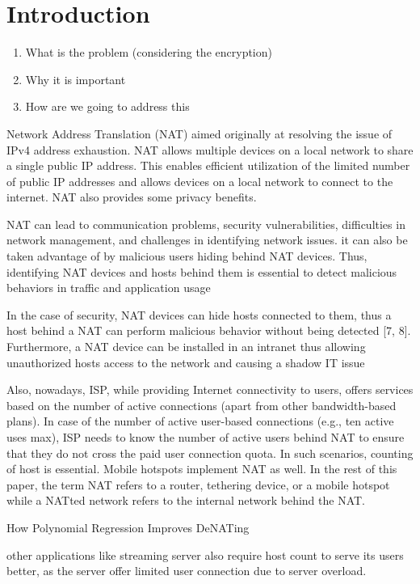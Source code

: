 \section{Introduction}\label{sec:intro}

\begin{enumerate}
    \item What is the problem (considering the encryption)
    \item Why it is important
    \item How are we going to address this 
\end{enumerate}

Network Address Translation (NAT) aimed originally at resolving the issue of IPv4 address exhaustion. NAT allows multiple devices on a local network to share a single public IP address. This enables efficient utilization of the limited number of public IP addresses and allows devices on a local network to connect to the internet. NAT also provides some privacy benefits.

NAT can lead to communication problems, security vulnerabilities, difficulties in network management, and challenges in identifying network issues. it can also be taken advantage of by malicious users hiding behind NAT devices. Thus, identifying NAT devices and hosts behind them is essential to detect malicious behaviors in traffic and application usage 

 In the case of security, NAT devices can hide hosts connected to them, thus a host behind a NAT can perform malicious behavior without being detected [7, 8]. Furthermore, a NAT device can be installed in an intranet thus allowing unauthorized hosts access to the network and causing a shadow IT issue

 Also, nowadays, ISP, while providing Internet connectivity to
users, offers services based on the number of active connections
(apart from other bandwidth-based plans). In case
of the number of active user-based connections (e.g., ten
active uses max), ISP needs to know the number of active
users behind NAT to ensure that they do not cross the paid
user connection quota. In such scenarios, counting of host
is essential.
Mobile hotspots implement NAT as well. In the rest of this paper, the term NAT refers to a router, tethering device, or a mobile hotspot while a NATted network refers to the internal network behind the NAT.

How Polynomial Regression Improves DeNATing

other applications like streaming server also
require host count to serve its users better, as the server
offer limited user connection due to server overload.



